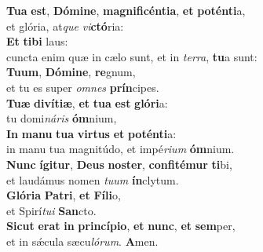 \evenverse \textbf{Tu}\textbf{a} \textbf{est}, \textbf{Dó}\textbf{mi}\textbf{ne}, \textbf{ma}\textbf{gni}\textbf{fi}\textbf{cén}\textbf{ti}\textbf{a}, \textbf{et} \textbf{po}\textbf{tén}\textbf{ti}a,~\*\\
\evenverse et glória, at\textit{que} \textit{vi}\textbf{ctó}ria:\\
\oddverse \textbf{Et} \textbf{ti}\textbf{bi} laus:~\*\\
\oddverse cuncta enim quæ in cælo sunt, et in \textit{ter}\textit{ra}, \textbf{tu}a sunt:\\
\evenverse \textbf{Tu}\textbf{um}, \textbf{Dó}\textbf{mi}\textbf{ne}, \textbf{re}gnum,~\*\\
\evenverse et tu es super \textit{om}\textit{nes} \textbf{prín}cipes.\\
\oddverse \textbf{Tu}\textbf{æ} \textbf{di}\textbf{ví}\textbf{ti}\textbf{æ}, \textbf{et} \textbf{tu}\textbf{a} \textbf{est} \textbf{gló}\textbf{ri}a:~\*\\
\oddverse tu domi\textit{ná}\textit{ris} \textbf{óm}nium,\\
\evenverse \textbf{In} \textbf{ma}\textbf{nu} \textbf{tu}\textbf{a} \textbf{vir}\textbf{tus} \textbf{et} \textbf{po}\textbf{tén}\textbf{ti}a:~\*\\
\evenverse in manu tua magnitúdo, et impé\textit{ri}\textit{um} \textbf{óm}nium.\\
\oddverse \textbf{Nunc} \textbf{í}\textbf{gi}\textbf{tur}, \textbf{De}\textbf{us} \textbf{no}\textbf{ster}, \textbf{con}\textbf{fi}\textbf{té}\textbf{mur} \textbf{ti}bi,~\*\\
\oddverse et laudámus nomen \textit{tu}\textit{um} \textbf{ín}clytum.\\
\evenverse \textbf{Gló}\textbf{ri}\textbf{a} \textbf{Pa}\textbf{tri}, \textbf{et} \textbf{Fí}\textbf{li}o,~\*\\
\evenverse et Spirí\textit{tu}\textit{i} \textbf{San}cto.\\
\oddverse \textbf{Si}\textbf{cut} \textbf{e}\textbf{rat} \textbf{in} \textbf{prin}\textbf{cí}\textbf{pi}\textbf{o}, \textbf{et} \textbf{nunc}, \textbf{et} \textbf{sem}per,~\*\\
\oddverse et in sǽcula sæcu\textit{ló}\textit{rum}. \textbf{A}men.\\
